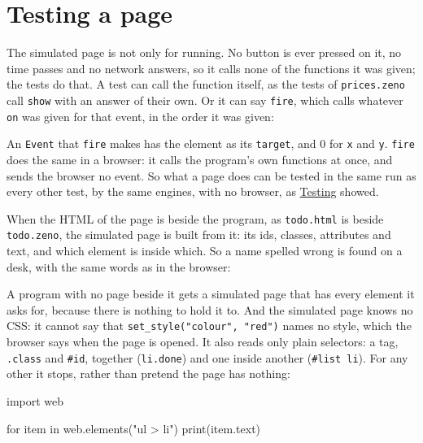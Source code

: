 \section{Testing a page}

The simulated page is not only for running. No button is ever pressed
on it, no time passes and no network answers, so it calls none of the
functions it was given; the tests do that. A test can call the
function itself, as the tests of \verb|prices.zeno| call \verb|show|
with an answer of their own. Or it can say \verb|fire|, which calls
whatever \verb|on| was given for that event, in the order it was given:

\begin{zeno}[src=examples/sketch.zeno, file=sketch.zeno, dir=sketch, show=no, cmd=zeno test {file}]
\end{zeno}

An \verb|Event| that \verb|fire| makes has the element as its
\verb|target|, and 0 for \verb|x| and \verb|y|. \verb|fire| does the
same in a browser: it calls the program's own functions at once, and
sends the browser no event. So what a page does can be tested in the
same run as every other test, by the same engines, with no browser, as
\hyperref[ch-testing]{Testing} showed.

When the HTML of the page is beside the program, as \verb|todo.html|
is beside \verb|todo.zeno|, the simulated page is built from it: its
ids, classes, attributes and text, and which element is inside which.
So a name spelled wrong is found on a desk, with the same words as in
the browser:

\begin{zeno}[file=notes.zeno, dir=todo, show=no, cmd=sed "s/#list/#lsit/" todo.zeno > typo.zeno ;; cp todo.html typo.html ;; zeno run typo.zeno, fails=yes]
\end{zeno}

A program with no page beside it gets a simulated page that has every
element it asks for, because there is nothing to hold it to. And the
simulated page knows no CSS: it cannot say that
\verb|set_style("colour", "red")| names no style, which the browser
says when the page is opened. It also reads only plain selectors: a
tag, \verb|.class| and \verb|#id|, together (\verb|li.done|) and one
inside another (\verb|#list li|). For any other it stops, rather than
pretend the page has nothing:

\begin{zeno}[fails=yes]
import web

for item in web.elements("ul > li") {
    print(item.text)
}
\end{zeno}


